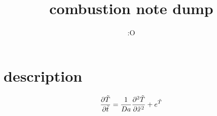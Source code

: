 \documentclass[12pt]{article}
\title{combustion note dump}
\author{:O}
\begin{document}
\maketitle
\section{description}


\begin{equation}
    \frac{\partial \Tilde{T}}{\partial \Tilde{t}} = \frac{1}{Da}\frac{\partial^2 \Tilde{T}}{\partial \Tilde{x}^2} + e^{\Tilde{T}}
\end{equation}
\end{document}
